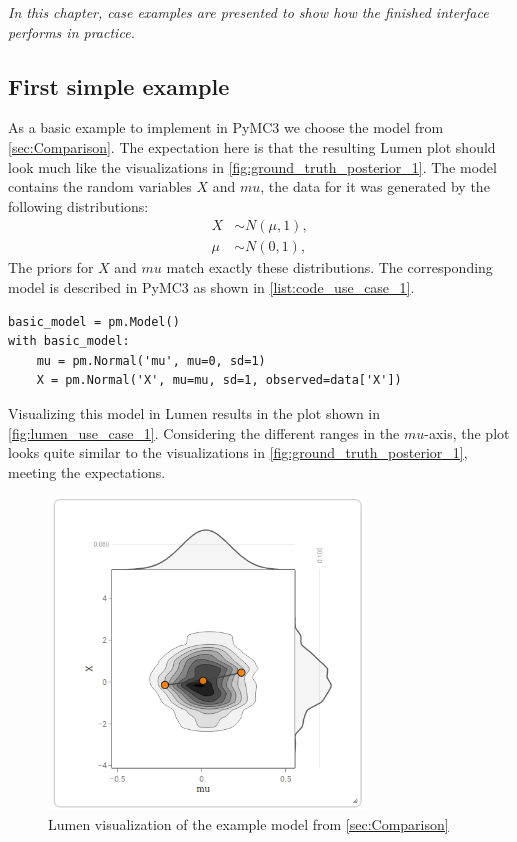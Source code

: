 \documentclass{article}
\begin{document}
\textit{In this chapter, case examples are presented to show how the finished interface performs in practice.}

\subsection{First simple example}
As a basic example to implement in PyMC3 we choose the model from \autoref{sec:Comparison}. The expectation here is that the resulting Lumen plot should look much like the visualizations in \autoref{fig:ground_truth_posterior_1}. The model contains the random variables $X$ and $mu$, the data for it was generated by the following  distributions:
\begin{equation}
\begin{split}
X &\sim N(\mu,1), \\
\mu &\sim N(0,1),
\end{split}
\end{equation}
The priors for $X$ and $mu$ match exactly these distributions. The corresponding model is described in PyMC3 as shown in \autoref{list:code_use_case_1}.
\begin{lstlisting}[caption={PyMC3 model of use case 1}, label={list:code_use_case_1},captionpos=b]
basic_model = pm.Model()
with basic_model:
    mu = pm.Normal('mu', mu=0, sd=1)
    X = pm.Normal('X', mu=mu, sd=1, observed=data['X'])
\end{lstlisting}
Visualizing this model in Lumen results in the plot shown in \autoref{fig:lumen_use_case_1}. Considering the different ranges in the $mu$-axis, the plot looks quite similar to the visualizations in \autoref{fig:ground_truth_posterior_1}, meeting the expectations.
\begin{figure}
	\centering
	\includegraphics[width=0.75\textwidth]{images/lumen_use_case_1_2.png}
	\caption{Lumen visualization of the example model from \autoref{sec:Comparison}}
	\label{fig:lumen_use_case_1}
\end{figure}
\end{document}
